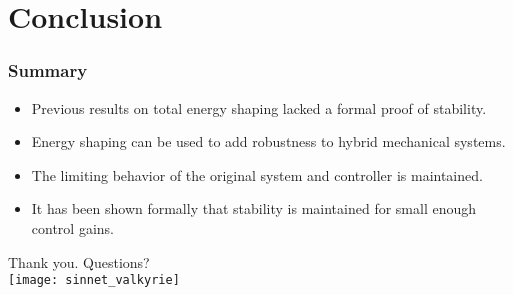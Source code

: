 \section{Conclusion}
\showtoc

\begin{frame}[t]
  \frametitle{Summary}
  \begin{itemize}
  \item Previous results on total energy shaping lacked a formal proof of
    stability.
  \item Energy shaping can be used to add robustness to hybrid mechanical
    systems.
  \item The limiting behavior of the original system and controller is
    maintained.
  \item It has been shown formally that stability is maintained for small enough
    control gains.
  \end{itemize}
\end{frame}

\begin{frame}
  \centering
  \LARGE{Thank you. Questions?}\\[0em]
  \texttt{[image: sinnet\_valkyrie]}
\end{frame}
